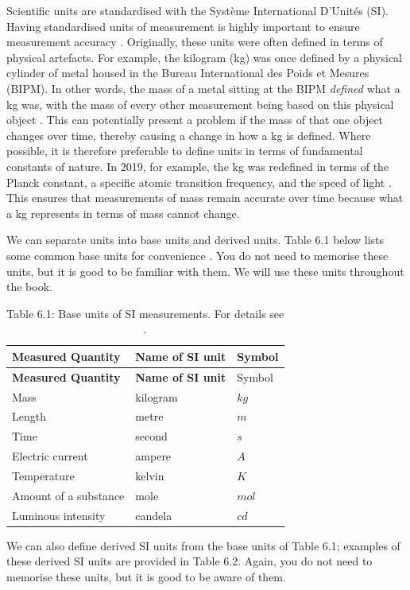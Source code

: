 \documentclass[
  openany]{scrbook}
\begin{document}
Scientific units are standardised with the Système International D'Unités (SI).
Having standardised units of measurement is highly important to ensure measurement accuracy \citep{Quinn1995}.
Originally, these units were often defined in terms of physical artefacts.
For example, the kilogram (kg) was once defined by a physical cylinder of metal housed in the Bureau International des Poids et Mesures (BIPM).
In other words, the mass of a metal sitting at the BIPM \emph{defined} what a kg was, with the mass of every other measurement being based on this physical object \citep{Quinn1995, Freedman2011}.
This can potentially present a problem if the mass of that one object changes over time, thereby causing a change in how a kg is defined.
Where possible, it is therefore preferable to define units in terms of fundamental constants of nature.
In 2019, for example, the kg was redefined in terms of the Planck constant, a specific atomic transition frequency, and the speed of light \citep{Stock2019}.
This ensures that measurements of mass remain accurate over time because what a kg represents in terms of mass cannot change.

We can separate units into base units and derived units.
Table 6.1 below lists some common base units for convenience \citep{Quinn1995}.
You do not need to memorise these units, but it is good to be familiar with them.
We will use these units throughout the book.

\begin{longtable}[]{@{}lll@{}}
\caption{Table 6.1: Base units of SI measurements. For details see \citet{Quinn1995}.}\tabularnewline
\toprule
\textbf{Measured Quantity} & \textbf{Name of SI unit} & Symbol \\
\midrule
\endfirsthead
\toprule
\textbf{Measured Quantity} & \textbf{Name of SI unit} & Symbol \\
\midrule
\endhead
Mass & kilogram & \(kg\) \\
Length & metre & \(m\) \\
Time & second & \(s\) \\
Electric current & ampere & \(A\) \\
Temperature & kelvin & \(K\) \\
Amount of a substance & mole & \(mol\) \\
Luminous intensity & candela & \(cd\) \\
\bottomrule
\end{longtable}

We can also define derived SI units from the base units of Table 6.1; examples of these derived SI units are provided in Table 6.2.
Again, you do not need to memorise these units, but it is good to be aware of them.
\end{document}
